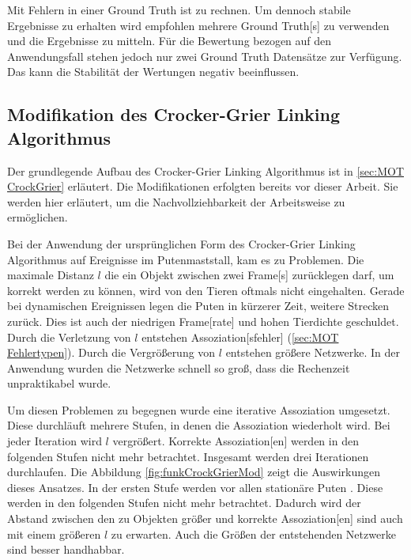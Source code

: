 Mit Fehlern in einer \gls{Ground Truth} ist zu rechnen. Um dennoch stabile Ergebnisse zu erhalten wird empfohlen mehrere \gls{Ground Truth}[s] zu verwenden und die Ergebnisse zu mitteln. Für die Bewertung bezogen auf den Anwendungsfall stehen jedoch nur zwei \gls{Ground Truth} Datensätze zur Verfügung. Das kann die Stabilität der Wertungen negativ beeinflussen.


\subsection{Modifikation des Crocker-Grier Linking Algorithmus} \label{sec:Meth CrockGrieMods}
Der grundlegende Aufbau des Crocker-Grier Linking Algorithmus ist in \autoref{sec:MOT CrockGrier} erläutert. Die Modifikationen erfolgten bereits vor dieser Arbeit. Sie werden hier erläutert, um die Nachvollziehbarkeit der Arbeitsweise zu ermöglichen. \par

Bei der Anwendung der ursprünglichen Form des Crocker-Grier Linking Algorithmus auf Ereignisse im Putenmaststall, kam es zu Problemen. Die maximale Distanz \(l\) die ein Objekt zwischen zwei \gls{Frame}[s] zurücklegen darf, um korrekt  werden zu können, wird von den Tieren oftmals nicht eingehalten. Gerade bei dynamischen Ereignissen legen die Puten in kürzerer Zeit, weitere Strecken zurück. Dies ist auch der niedrigen \gls{Frame}[rate] und hohen Tierdichte geschuldet. Durch die Verletzung von \(l\) entstehen \gls{Assoziation}[sfehler] (\autoref{sec:MOT Fehlertypen}). Durch die Vergrößerung von \(l\) entstehen größere Netzwerke. In der Anwendung wurden die Netzwerke schnell so groß, dass die Rechenzeit unpraktikabel wurde.\par

Um diesen Problemen zu begegnen wurde eine iterative \gls{Assoziation} umgesetzt. Diese durchläuft mehrere Stufen, in denen die \gls{Assoziation} wiederholt wird. Bei jeder Iteration wird \(l\) vergrößert. Korrekte \gls{Assoziation}[en] werden in den folgenden Stufen nicht mehr betrachtet. Insgesamt werden drei Iterationen durchlaufen. Die Abbildung \ref{fig:funkCrockGrierMod} zeigt die Auswirkungen dieses Ansatzes. In der ersten Stufe werden vor allen stationäre Puten . Diese werden in den folgenden Stufen nicht mehr betrachtet. Dadurch wird der Abstand zwischen den zu  Objekten größer und korrekte \gls{Assoziation}[en] sind auch mit einem größeren \(l\) zu erwarten. Auch die Größen der entstehenden Netzwerke sind besser handhabbar. 

